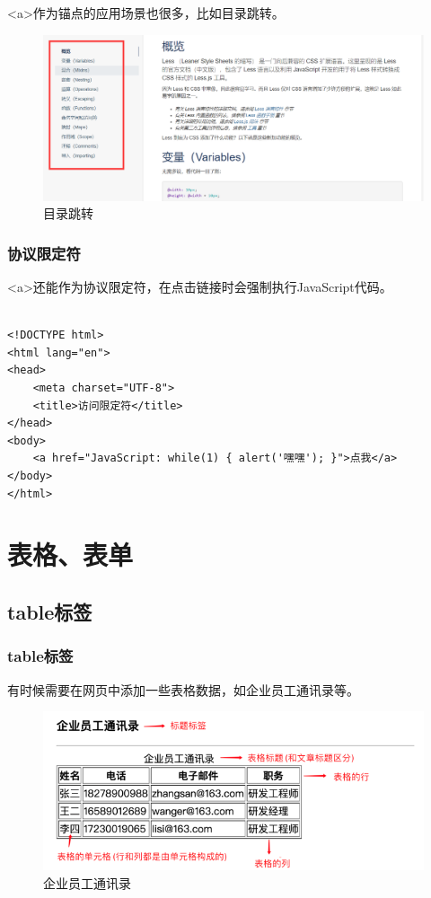 <a>作为锚点的应用场景也很多，比如目录跳转。

\begin{figure}[H]
	\centering
	\includegraphics[scale=0.35]{img/C3/3-4/1.png}
	\caption{目录跳转}
\end{figure}

\subsection{协议限定符}

<a>还能作为协议限定符，在点击链接时会强制执行JavaScript代码。 \\

 \\

\begin{lstlisting}[style=htmlcssjs]
<!DOCTYPE html>
<html lang="en">
<head>
    <meta charset="UTF-8">
    <title>访问限定符</title>
</head>
<body>
    <a href="JavaScript: while(1) { alert('嘿嘿'); }">点我</a>
</body>
</html>
\end{lstlisting}

\newpage

\chapter{表格、表单}

\section{table标签}

\subsection{table标签}

有时候需要在网页中添加一些表格数据，如企业员工通讯录等。

\begin{figure}[H]
	\centering
	\includegraphics[scale=0.9]{img/C4/4-1/1.png}
	\caption{企业员工通讯录}
\end{figure}

